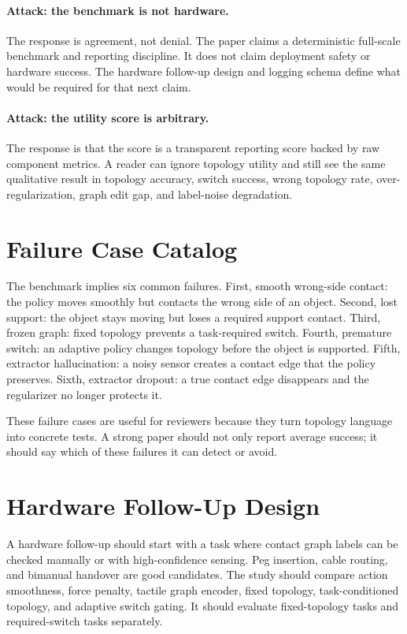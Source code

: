 \documentclass{article}
\begin{document}
\paragraph{Attack: the benchmark is not hardware.}
The response is agreement, not denial. The paper claims a deterministic full-scale benchmark and reporting discipline. It does not claim deployment safety or hardware success. The hardware follow-up design and logging schema define what would be required for that next claim.

\paragraph{Attack: the utility score is arbitrary.}
The response is that the score is a transparent reporting score backed by raw component metrics. A reader can ignore topology utility and still see the same qualitative result in topology accuracy, switch success, wrong topology rate, over-regularization, graph edit gap, and label-noise degradation.

\section{Failure Case Catalog}

The benchmark implies six common failures. First, smooth wrong-side contact: the policy moves smoothly but contacts the wrong side of an object. Second, lost support: the object stays moving but loses a required support contact. Third, frozen graph: fixed topology prevents a task-required switch. Fourth, premature switch: an adaptive policy changes topology before the object is supported. Fifth, extractor hallucination: a noisy sensor creates a contact edge that the policy preserves. Sixth, extractor dropout: a true contact edge disappears and the regularizer no longer protects it.

These failure cases are useful for reviewers because they turn topology language into concrete tests. A strong paper should not only report average success; it should say which of these failures it can detect or avoid.

\section{Hardware Follow-Up Design}

A hardware follow-up should start with a task where contact graph labels can be checked manually or with high-confidence sensing. Peg insertion, cable routing, and bimanual handover are good candidates. The study should compare action smoothness, force penalty, tactile graph encoder, fixed topology, task-conditioned topology, and adaptive switch gating. It should evaluate fixed-topology tasks and required-switch tasks separately.
\end{document}
